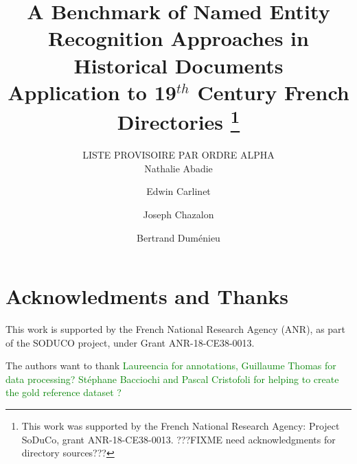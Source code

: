 \documentclass[runningheads,svgnames]{llncs}
\begin{document}
%
\title{A Benchmark of Named Entity Recognition Approaches in Historical Documents\\
Application to 19$^{th}$ Century French Directories%
\thanks{This work was supported by the French National Research Agency:
Project SoDuCo, grant ANR-18-CE38-0013. ???FIXME need acknowledgments for directory sources???}}
%
%
\author{LISTE PROVISOIRE PAR ORDRE ALPHA\\
%
Nathalie Abadie \and
Edwin Carlinet \and
Joseph Chazalon \and
Bertrand Duménieu}
%
%
%
\maketitle              %
%
\begin{abstract}

\end{abstract}









\section*{Acknowledments and Thanks}
This work is supported by the French National Research Agency (ANR), as part of the SODUCO project, under Grant ANR-18-CE38-0013.

The authors want to thank \textcolor{green}{Laureencia for annotations, Guillaume Thomas for data processing? Stéphane Bacciochi and Pascal Cristofoli for helping to create the gold reference dataset ?}



\end{document}
